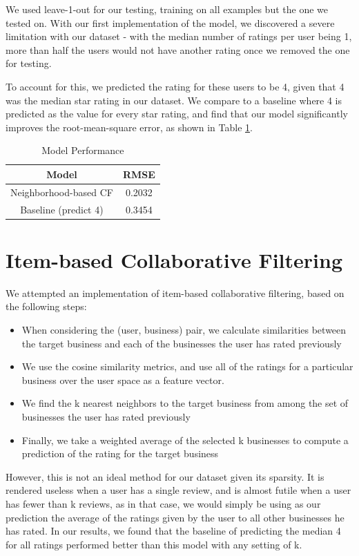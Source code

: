 \documentclass[10pt, letterpaper]{article}
\begin{document}
We used leave-1-out for our testing, training on all examples but the one
we tested on. With our first implementation of the model, we discovered a severe
limitation with our dataset - with the median number of ratings per user
being 1, more than half the users would not have another rating once we
removed the one for testing. 

To account for this, we predicted the rating for these users to be 4,
given that 4 was the median star rating in our dataset. We compare to a
baseline where 4 is predicted as the value for every star rating, and find
that our model significantly improves the root-mean-square error, as shown
in Table \ref{ncf}.

\begin{table}[htb]
\centering
\begin{tabular}{|c|c|}
\hline
{\bf Model} &{\bf RMSE} \tabularnewline \hline
Neighborhood-based CF &0.2032 \tabularnewline
Baseline (predict 4) &0.3454
\tabularnewline \hline

\end{tabular}
\caption{ Model Performance }
\label{ncf}
\end{table}

\section{Item-based Collaborative Filtering}
We attempted an implementation of item-based collaborative
filtering, based on the following steps:

\begin{itemize}
\item When considering the (user, business) pair, we calculate similarities
  between the target business and each of the businesses the user has
  rated previously
\item We use the cosine similarity metrics, and
  use all of the ratings for a particular business over the user space as
  a feature vector.
\item We find the k nearest neighbors to the target business from among
  the set of businesses the user has rated previously
\item Finally, we take a weighted average of the selected k businesses to
  compute a prediction of the rating for the target business 
\end{itemize}

However, this is not an ideal method for our dataset given its
sparsity. It is rendered useless when a user has a single review, and is
almost futile when a user has fewer than k reviews, as in that case, we
would simply be using as our prediction the average of the ratings
given by the user to all other businesses he has rated. In our results,
we found that the baseline of predicting the median 4 for all ratings
performed better than this model with any setting of k. 
\end{document}
